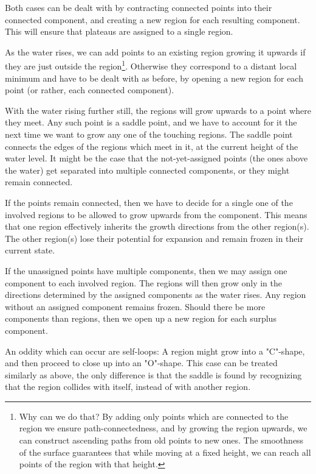 \documentclass[a4paper,12pt,notitlepage,fullpage]{paper}
\theoremstyle{plain}
\theoremstyle{definition}
\begin{document}
Both cases can be dealt with by contracting connected points into their connected component, and creating a new region for each resulting component. This will ensure that plateaus are assigned to a single region.

As the water rises, we can add points to an existing region growing it upwards if they are just outside the region\footnote{Why can we do that?
By adding only points which are connected to the region we ensure path-connectedness, and by growing the region upwards, we can construct ascending paths from old points to new ones.
The smoothness of the surface guarantees that while moving at a fixed height, we can reach all points of the region with that height.}. Otherwise they correspond to a distant local minimum and have to be dealt with as before, by opening a new region for each point (or rather, each connected component).

With the water rising further still, the regions will grow upwards to a point where they meet. Any such point is a saddle point, and we have to account for it the next time we want to grow any one of the touching regions. The saddle point connects the edges of the regions which meet in it, at the current height of the water level. It might be the case that the not-yet-assigned points (the ones above the water) get separated into multiple connected components, or they might remain connected.

If the points remain connected, then we have to decide for a single one of the involved regions to be allowed to grow upwards from the component. This means that one region effectively inherits the growth directions from the other region(s). The other region(s) lose their potential for expansion and remain frozen in their current state.

If the unassigned points have multiple components, then we may assign one component to each involved region. The regions will then grow only in the directions determined by the assigned components as the water rises. Any region without an assigned component remains frozen. Should there be more components than regions, then we open up a new region for each surplus component.

An oddity which can occur are self-loops: A region might grow into a "C"-shape, and then proceed to close up into an "O"-shape. This case can be treated similarly as above, the only difference is that the saddle is found by recognizing that the region collides with itself, instead of with another region.
\end{document}
